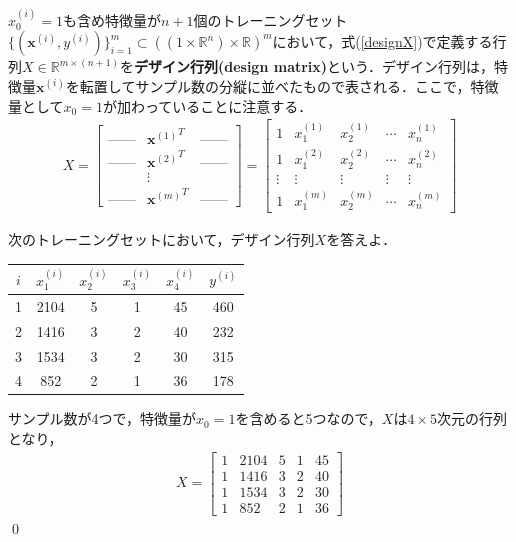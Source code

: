 \begin{defi}[デザイン行列]
$x_0^{(i)}=1$も含め特徴量が$n+1$個のトレーニングセット$\{({\bm x}^{(i)},y^{(i)})\}_{i=1}^m\subset ((1 \times \mathbb{R}^n) \times \mathbb{R})^m$において，式(\ref{designX})で定義する行列$X \in \mathbb{R}^{m\times (n+1)}$を{\bf デザイン行列(design matrix)}という．デザイン行列は，特徴量${\bm x}^{(i)}$を転置してサンプル数の分縦に並べたもので表される．ここで，特徴量として$x_0=1$が加わっていることに注意する．
\begin{align}
X = 
\begin{bmatrix}
\mbox{------} & {{\bm x}^{(1)}}^T & \mbox{------} \\
\mbox{------} & {{\bm x}^{(2)}}^T & \mbox{------} \\
 & \vdots & \\
\mbox{------} & {{\bm x}^{(m)}}^T & \mbox{------}
\end{bmatrix}
=
\begin{bmatrix}
1 & x_1^{(1)} & x_2^{(1)} & \cdots & x_n^{(1)} \\
1 & x_1^{(2)} & x_2^{(2)} & \cdots & x_n^{(2)} \\
\vdots & \vdots & \vdots & \vdots & \vdots \\
1 & x_1^{(m)} & x_2^{(m)} & \cdots & x_n^{(m)} 
\end{bmatrix} \label{designX}
\end{align}
\end{defi}

\begin{qu}
次のトレーニングセットにおいて，デザイン行列$X$を答えよ．
\begin{table}[H]
\centering
\begin{tabular}{cccccc}
\hline
$i$ &$x_1^{(i)}$ &$x_2^{(i)}$ &$x_3^{(i)}$ &$x_4^{(i)}$ & $y^{(i)}$ \\ \hline
1 & 2104 & 5 & 1 & 45 & 460 \\
2 & 1416 & 3 & 2 & 40 & 232 \\
3 & 1534 & 3 & 2 & 30 & 315 \\
4 & 852  & 2 & 1 & 36 & 178 \\ \hline
\end{tabular}
\end{table}
\end{qu}
\begin{ans}
サンプル数が4つで，特徴量が$x_0=1$を含めると5つなので，$X$は$4\times 5$次元の行列となり，
\begin{align*}
X=
\begin{bmatrix}
1 & 2104 & 5 & 1 & 45 \\
1 & 1416 & 3 & 2 & 40 \\
1 & 1534 & 3 & 2 & 30 \\
1 & 852  & 2 & 1 & 36 
\end{bmatrix}
\end{align*}\qed
\end{ans}

